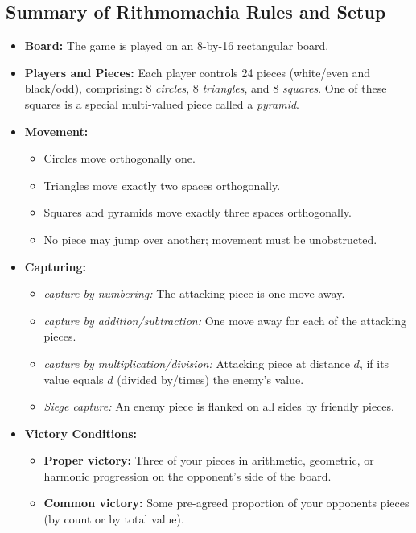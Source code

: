 \documentclass[12pt]{article}
\begin{document}
\subsection{Summary of Rithmomachia Rules and Setup}

\begin{itemize}
    \item \textbf{Board:} The game is played on an 8-by-16 rectangular board. 

    \item \textbf{Players and Pieces:} Each player controls 24 pieces (white/even and black/odd), comprising:
      8 \emph{circles}, 8 \emph{triangles}, and 8 \emph{squares}. One of these squares is a
      special multi-valued piece called a {\it pyramid}. 

    \item \textbf{Movement:}
    \begin{itemize}
        \item Circles move orthogonally one.
        \item Triangles move exactly two spaces orthogonally.
        \item Squares and pyramids move exactly three spaces orthogonally.
        \item No piece may jump over another; movement must be unobstructed.
    \end{itemize}

    \item \textbf{Capturing:}
    \begin{itemize}
        \item \emph{capture by numbering:} The attacking piece is one move away.
        \item \emph{capture by addition/subtraction:} One move away for each of the attacking pieces.
        \item \emph{capture by multiplication/division:} Attacking piece at distance $d$, if its value
          equals $d$ (divided by/times) the enemy’s value.
        \item \emph{Siege capture:} An enemy piece is flanked on all sides by friendly pieces.
    \end{itemize}

    \item \textbf{Victory Conditions:}
    \begin{itemize}
        \item \textbf{Proper victory:} 
          Three of your pieces in arithmetic, geometric, or harmonic progression
          on the opponent's side of the board.
        \item \textbf{Common victory:} Some pre-agreed proportion of
          your opponents pieces (by count or by total value).
\end{itemize}
           


\end{itemize}
\end{document}
